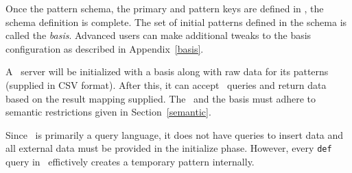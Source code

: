 

Once the pattern schema, the primary and pattern keys are defined in \dcl, the schema definition is complete. The set of initial patterns defined in the schema is called the {\em basis}. Advanced users can make additional tweaks to the basis configuration as described in Appendix~\ref{basis}.

A \dsl~server will be initialized with a basis along with raw data for its patterns (supplied in CSV format). 
After this, it can accept \dsl~queries and return data based on the result mapping supplied. The \dsl~and the basis must adhere to semantic restrictions given in Section~\ref{semantic}. 

Since \dsl~is primarily a query language, it does not have queries to insert data and all external data must be provided in the initialize phase. However, every \texttt{def} query in \dsl~effictively creates a temporary pattern internally. 


